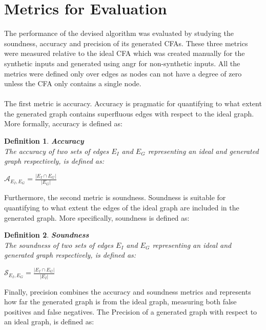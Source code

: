 \documentclass{kththesis}
\newtheorem*{definition}{Definition}
\newcommand{\fbcomment}[1]{{#1}}
\renewcommand{\fbcomment}[1]{}
\begin{document}
\section{Metrics for Evaluation}\label{sec:metrics}
\fbcomment{\color{red}Goal: Introduce the metrics that will be used in the result chapter. Was put in the end of the method chapter since it is only relevant for the result chapter(The notions are introduced in the background chapter but not given formal definitions until now).}
The performance of the devised algorithm was evaluated by studying the soundness, accuracy and precision of its generated CFAs. These three metrics were measured relative to the ideal CFA which was created manually for the synthetic inputs and generated using angr for non-synthetic inputs. All the metrics were defined only over edges as nodes can not have a degree of zero unless the CFA only contains a single node.
\\ \\
The first metric is accuracy. Accuracy is pragmatic for quantifying to what extent the generated graph contains superfluous edges with respect to the ideal graph. More formally, accuracy is defined as:
\begin{definition} \textbf{Accuracy}\\
The accuracy of two sets of edges $E_I$ and $E_G$ representing an ideal and generated graph respectively, is defined as:
\begin{center}
$\mathcal{A}_{E_I,E_G} = \frac{|E_I \cap E_G|}{|E_G|}$    
\end{center}
\end{definition}
\noindent
Furthermore, the second metric is soundness. Soundness is suitable for quantifying to what extent the edges of the ideal graph are included in the generated graph. More specifically, soundness is defined as:
\begin{definition} \textbf{Soundness}\\
The soundness of two sets of edges $E_I$ and $E_G$ representing an ideal and generated graph respectively, is defined as:
\begin{center}
$\mathcal{S}_{E_I,E_G} = \frac{|E_I \cap E_G|}{|E_I|}$    
\end{center}
\end{definition}
\noindent
Finally, precision combines the accuracy and soundness metrics and represents how far the generated graph is from the ideal graph, measuring both false positives and false negatives. The Precision of a generated graph with respect to an ideal graph, is defined as:
\end{document}
